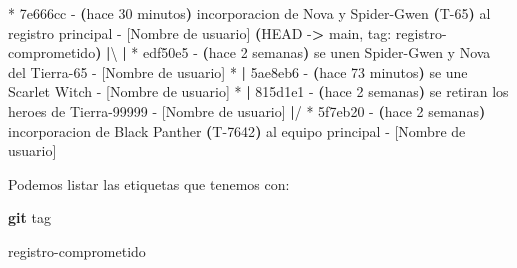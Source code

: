 \documentclass[
]{book}
\newenvironment{Shaded}{\begin{snugshade}}{\end{snugshade}}
\newcommand{\AttributeTok}[1]{\textcolor[rgb]{0.13,0.29,0.53}{#1}}
\newcommand{\ErrorTok}[1]{\textcolor[rgb]{0.64,0.00,0.00}{\textbf{#1}}}
\newcommand{\ExtensionTok}[1]{#1}
\newcommand{\FunctionTok}[1]{\textcolor[rgb]{0.13,0.29,0.53}{\textbf{#1}}}
\newcommand{\KeywordTok}[1]{\textcolor[rgb]{0.13,0.29,0.53}{\textbf{#1}}}
\newcommand{\NormalTok}[1]{#1}
\newcommand{\OperatorTok}[1]{\textcolor[rgb]{0.81,0.36,0.00}{\textbf{#1}}}
\begin{document}
\begin{Shaded}
\begin{Highlighting}[]
\ExtensionTok{*}\NormalTok{   7e666cc }\AttributeTok{{-}} \ErrorTok{(}\ExtensionTok{hace}\NormalTok{ 30 minutos}\KeywordTok{)} \ExtensionTok{incorporacion}\NormalTok{ de Nova y Spider{-}Gwen }\ErrorTok{(}\ExtensionTok{T{-}65}\KeywordTok{)} \ExtensionTok{al}\NormalTok{ registro principal }\AttributeTok{{-}}\NormalTok{ [Nombre de usuario] }\ErrorTok{(}\ExtensionTok{HEAD} \AttributeTok{{-}}\OperatorTok{\textgreater{}}\NormalTok{ main, tag: registro{-}comprometido}\KeywordTok{)}
\KeywordTok{|}\ExtensionTok{\textbackslash{} } 
\KeywordTok{|} \ExtensionTok{*}\NormalTok{ edf50e5 }\AttributeTok{{-}} \ErrorTok{(}\ExtensionTok{hace}\NormalTok{ 2 semanas}\KeywordTok{)} \ExtensionTok{se}\NormalTok{ unen Spider{-}Gwen y Nova del Tierra{-}65 }\AttributeTok{{-}}\NormalTok{ [Nombre de usuario]}
\ExtensionTok{*} \KeywordTok{|} \ExtensionTok{5ae8eb6} \AttributeTok{{-}} \ErrorTok{(}\ExtensionTok{hace}\NormalTok{ 73 minutos}\KeywordTok{)} \ExtensionTok{se}\NormalTok{ une Scarlet Witch }\AttributeTok{{-}}\NormalTok{ [Nombre de usuario]}
\ExtensionTok{*} \KeywordTok{|} \ExtensionTok{815d1e1} \AttributeTok{{-}} \ErrorTok{(}\ExtensionTok{hace}\NormalTok{ 2 semanas}\KeywordTok{)} \ExtensionTok{se}\NormalTok{ retiran los heroes de Tierra{-}99999 }\AttributeTok{{-}}\NormalTok{ [Nombre de usuario]}
\KeywordTok{|}\ExtensionTok{/}  
\ExtensionTok{*}\NormalTok{   5f7eb20 }\AttributeTok{{-}} \ErrorTok{(}\ExtensionTok{hace}\NormalTok{ 2 semanas}\KeywordTok{)} \ExtensionTok{incorporacion}\NormalTok{ de Black Panther }\ErrorTok{(}\ExtensionTok{T{-}7642}\KeywordTok{)} \ExtensionTok{al}\NormalTok{ equipo principal }\AttributeTok{{-}}\NormalTok{ [Nombre de usuario]}
\end{Highlighting}
\end{Shaded}

Podemos listar las etiquetas que tenemos con:

\begin{Shaded}
\begin{Highlighting}[]
\FunctionTok{git}\NormalTok{ tag}
\end{Highlighting}
\end{Shaded}

\begin{Shaded}
\begin{Highlighting}[]
\ExtensionTok{registro{-}comprometido}
\end{Highlighting}
\end{Shaded}
\end{document}
